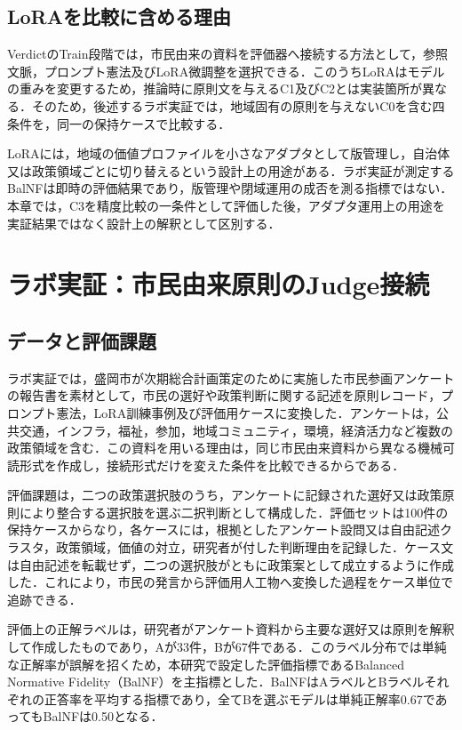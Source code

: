 \subsection{LoRAを比較に含める理由}

VerdictのTrain段階では，市民由来の資料を評価器へ接続する方法として，参照文脈，プロンプト憲法及びLoRA微調整を選択できる．このうちLoRAはモデルの重みを変更するため，推論時に原則文を与えるC1及びC2とは実装箇所が異なる．そのため，後述するラボ実証では，地域固有の原則を与えないC0を含む四条件を，同一の保持ケースで比較する．

LoRAには，地域の価値プロファイルを小さなアダプタとして版管理し，自治体又は政策領域ごとに切り替えるという設計上の用途がある．ラボ実証が測定するBalNFは即時の評価結果であり，版管理や閉域運用の成否を測る指標ではない．本章では，C3を精度比較の一条件として評価した後，アダプタ運用上の用途を実証結果ではなく設計上の解釈として区別する．

\section{ラボ実証：市民由来原則のJudge接続}
\label{sec:ch8_lab_benchmark}

\subsection{データと評価課題}

ラボ実証では，盛岡市が次期総合計画策定のために実施した市民参画アンケートの報告書を素材として，市民の選好や政策判断に関する記述を原則レコード，プロンプト憲法，LoRA訓練事例及び評価用ケースに変換した\cite{morioka2024citizenparticipation}．アンケートは，公共交通，インフラ，福祉，参加，地域コミュニティ，環境，経済活力など複数の政策領域を含む．この資料を用いる理由は，同じ市民由来資料から異なる機械可読形式を作成し，接続形式だけを変えた条件を比較できるからである．

評価課題は，二つの政策選択肢のうち，アンケートに記録された選好又は政策原則により整合する選択肢を選ぶ二択判断として構成した．評価セットは100件の保持ケースからなり，各ケースには，根拠としたアンケート設問又は自由記述クラスタ，政策領域，価値の対立，研究者が付した判断理由を記録した．ケース文は自由記述を転載せず，二つの選択肢がともに政策案として成立するように作成した．これにより，市民の発言から評価用人工物へ変換した過程をケース単位で追跡できる．

評価上の正解ラベルは，研究者がアンケート資料から主要な選好又は原則を解釈して作成したものであり，Aが33件，Bが67件である．このラベル分布では単純な正解率が誤解を招くため，本研究で設定した評価指標であるBalanced Normative Fidelity（BalNF）を主指標とした．BalNFはAラベルとBラベルそれぞれの正答率を平均する指標であり，全てBを選ぶモデルは単純正解率0.67であってもBalNFは0.50となる．

